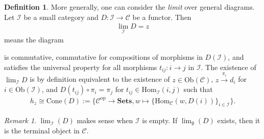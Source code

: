 \documentclass[12pt]{report}
\theoremstyle{plain}
\theoremstyle{remark}
\newtheorem*{remark}{Remark}
\theoremstyle{definition}
\newtheorem{definition}[theorem]{Definition}
\newcommand{\Hom}[3]{\mathrm{Hom}_{#3}(#1,#2)}
\begin{document}
\begin{definition}
    More generally, one can consider the \emph{limit} over general diagrams. Let $\mathcal{I}$ be a small category and $D:\mathcal{I}\rightarrow\mathcal{C}$ be a functor. Then
    \begin{align*}
        \lim_{\mathcal{I}}D = z
    \end{align*}
    means the diagram
    \begin{figure}[H]
        \centering
    \end{figure}
    \noindent is commutative, commutative for compositions of morphisms in $D(\mathcal{I})$, and satisfies the universal property for all morphisms $t_{ij}:i\rightarrow j$ in $\mathcal{I}$. The existence of $\lim_\mathcal{I}D$ is by definition equivalent to the existence of $z\in\mathrm{Ob(\mathcal{C})}$, $z\stackrel{\pi_i}{\rightarrow} d_i$ for $i\in\mathrm{Ob}(\mathcal{I})$, and $D(t_{ij})\circ \pi_i = \pi_j$ for $t_{ij}\in\Hom{i}{j}{\mathcal{I}}$ such that
    \begin{align*}
        h_z \cong \mathrm{Cone}(D) := \{ \mathcal{C}^\mathrm{op}\rightarrow \mathbf{Sets}, w\mapsto \{\Hom{w}{D(i)}{\mathcal{C}} \}_{i\in\mathcal{I}} \}.
    \end{align*}
\end{definition}
\begin{remark}
    $\lim_\mathcal{I}(D)$ makes sense when $\mathcal{I}$ is empty. If $\lim_\emptyset(D)$ exists, then it is the terminal object in $\mathcal{C}$.
\end{remark}
\end{document}
